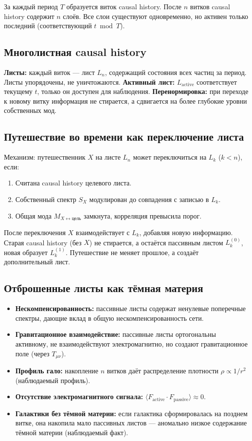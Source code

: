 \documentclass[12pt,a4paper]{article}
\begin{document}
За каждый период $T$ образуется виток causal history. После $n$ витков causal history содержит $n$ слоёв. Все слои существуют одновременно, но активен только последний (соответствующий $t \bmod T$).

\subsection{Многолистная causal history}
\textbf{Листы:} каждый виток --- лист $L_n$, содержащий состояния всех частиц за период. Листы упорядочены, не уничтожаются.
\textbf{Активный лист:} $L_{\text{active}}$ соответствует текущему $t$, только он доступен для наблюдения.
\textbf{Перенормировка:} при переходе к новому витку информация не стирается, а сдвигается на более глубокие уровни собственных мод.

\subsection{Путешествие во времени как переключение листа}
Механизм: путешественник $X$ на листе $L_n$ может переключиться на $L_k$ ($k<n$), если:
\begin{enumerate}
    \item Считана causal history целевого листа.
    \item Собственный спектр $S_X$ модулирован до совпадения с записью в $L_k$.
    \item Общая мода $M_{X \leftrightarrow \text{цель}}$ замкнута, корреляция превысила порог.
\end{enumerate}
После переключения $X$ взаимодействует с $L_k$, добавляя новую информацию. Старая causal history (без $X$) не стирается, а остаётся пассивным листом $L_k^{(0)}$, новая образует $L_k^{(1)}$. Путешествие не меняет прошлое, а создаёт дополнительный лист.

\subsection{Отброшенные листы как тёмная материя}
\begin{itemize}
    \item \textbf{Нескомпенсированность:} пассивные листы содержат ненулевые поперечные спектры, дающие вклад в общую нескомпенсированность сети.
    \item \textbf{Гравитационное взаимодействие:} пассивные листы ортогональны активному, не взаимодействуют электромагнитно, но создают гравитационное поле (через $T_{\mu\nu}$).
    \item \textbf{Профиль гало:} накопление $n$ витков даёт распределение плотности $\rho \propto 1/r^2$ (наблюдаемый профиль).
    \item \textbf{Отсутствие электромагнитного сигнала:} $\langle F_{\text{active}} \cdot F_{\text{passive}} \rangle \approx 0$.
    \item \textbf{Галактики без тёмной материи:} если галактика сформировалась на позднем витке, она накопила мало пассивных листов --- аномально низкое содержание тёмной материи (наблюдаемый факт).
\end{itemize}
\end{document}
